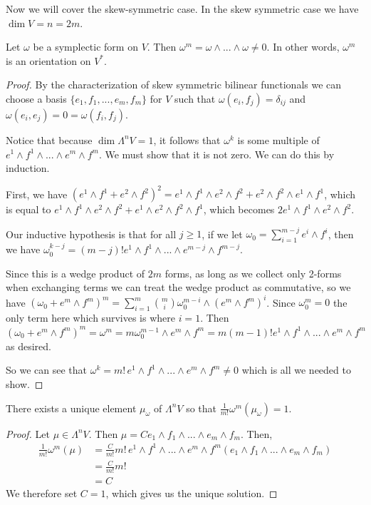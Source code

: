 Now we will cover the skew-symmetric case. In the skew symmetric case we have $\dim V = n=2m$.
\begin{lemma}
    Let $\omega$ be a symplectic form on $V$. Then $\omega^m = \omega\wedge...\wedge\omega \neq 0$. In other words, $\omega^m$ is an orientation on $V^*$.
\end{lemma}
\begin{proof}
By the characterization of skew symmetric bilinear functionals we can choose a basis $\{e_1,f_1,...,e_m,f_m\}$ for $V$ such that $\omega(e_i,f_j)=\delta_{ij}$ and $\omega(e_i,e_j)=0=\omega(f_i,f_j)$.

Notice that because $\dim \Lambda^n V = 1$, it follows that $\omega^k$ is some multiple of $e^1\wedge f^1\wedge...\wedge e^m\wedge f^m$. We must show that it is not zero. We can do this by induction.

First, we have $(e^1\wedge f^1 + e^2 \wedge f^2)^2 = e^1\wedge f^1 \wedge e^2 \wedge f^2 + e^2\wedge f^2 \wedge e^1 \wedge f^1$, which is equal to $e^1 \wedge f^1 \wedge e^2 \wedge f^2 + e^1 \wedge e^2\wedge f^2\wedge f^1$, which becomes $2e^1\wedge f^1\wedge e^2\wedge f^2$. 

Our inductive hypothesis is that for all $j \geq 1$, if we let $\omega_0 = \sum_{i=1}^{m-j} e^i\wedge f^i$, then we have $\omega_0^{k-j} = (m-j)! e^1\wedge f^1\wedge...\wedge e^{m-j}\wedge f^{m-j}$. 

Since this is a wedge product of $2m$ forms, as long as we collect only 2-forms when exchanging terms we can treat the wedge product as commutative, so we have $(\omega_0 + e^m\wedge f^m)^m = \sum_{i=1}^m \binom{m}{i} \omega_0^{m-i} \wedge (e^m\wedge f^m)^i$. Since $\omega_0^m = 0$ the only term here which survives is where $i=1$. Then $(\omega_0+e^m\wedge f^m)^m = \omega^m = m \omega_0^{m-1}\wedge e^m\wedge f^m = m(m-1)! e^1\wedge f^1\wedge...\wedge e^m\wedge f^m$ as desired.

So we can see that $\omega^k = m! \,e^1\wedge f^1\wedge...\wedge e^m \wedge f^m \neq 0$ which is all we needed to show.
\end{proof}
\begin{thm}
    There exists a unique element $\mu_\omega$ of $\Lambda^n V$ so that $\frac{1}{m!} \omega^m(\mu_\omega) = 1$. \label{defn:symplectic_volume}
\end{thm}
\begin{proof}
    Let $\mu\in \Lambda^n V$. Then $\mu = C e_1\wedge f_1\wedge...\wedge e_m \wedge f_m$. Then,
    \begin{align*}\frac{1}{m!} \omega^m(\mu)&= \frac{C}{m!} m!\, e^1\wedge f^1\wedge...\wedge e^m\wedge f^m(e_1\wedge f_1\wedge...\wedge e_m \wedge f_m)\\
    &= \frac{C}{m!}m!\\
    &= C
    \end{align*}
    We therefore set $C=1$, which gives us the unique solution.
\end{proof}
